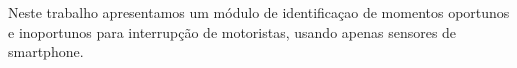 \label{solucao}

Neste trabalho apresentamos um módulo de identificaçao de momentos oportunos e inoportunos para interrupção de
motoristas, usando apenas sensores de smartphone.

